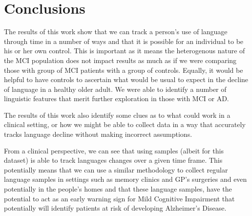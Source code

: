 \documentclass[12pt]{article}
\begin{document}
\section{Conclusions}\label{conclusions}
The results of this work show that we can track a person's use of language through time in a number of ways and that it is possible for an individual to be his or her own control. This is important as it means the heterogenous nature of the MCI population does not impact results as much as if we were comparing those with group of MCI patients with a group of controls. Equally, it would be helpful to have controls to ascertain what would be usual to expect in the decline of language in a healthy older adult. We were able to identify a number of linguistic features that merit further exploration in those with MCI or AD. 
\par 
The results of this work also identify some clues as to what could work in a clinical setting, or how we might be able to collect data in a way that accurately tracks language decline without making incorrect assumptions. 
\par
From a clinical perspective, we can see that using samples (albeit for this dataset) is able to track languages changes over a given time frame. This potentially means that we can use a similar methodology to collect regular language samples in settings such as memory clinics and GP's surgeries and even potentially in the people's homes and that these language samples, have the potential to act as an early warning sign for Mild Cognitive Impairment that potentially will identify patients at risk of developing Alzheimer's Disease.


\end{document}
